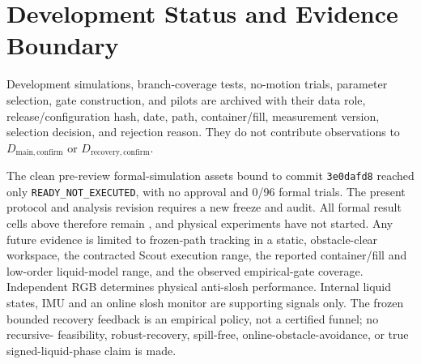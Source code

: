 \section{Development Status and Evidence Boundary}

Development simulations, branch-coverage tests, no-motion trials, parameter
selection, gate construction, and pilots are archived with their data role,
release/configuration hash, date, path, container/fill, measurement version,
selection decision, and rejection reason. They do not contribute observations
to $D_{\mathrm{main,confirm}}$ or $D_{\mathrm{recovery,confirm}}$.

The clean pre-review formal-simulation assets bound to commit
\texttt{3e0dafd8} reached only \texttt{READY\_NOT\_EXECUTED}, with no approval
and 0/96 formal trials. The present protocol and analysis revision requires a
new freeze and audit. All formal
result cells above therefore remain \Pending{}, and physical experiments have
not started. Any future evidence is
limited to frozen-path tracking in a static, obstacle-clear workspace, the
contracted Scout execution range, the reported container/fill and low-order
liquid-model range, and the observed empirical-gate coverage. Independent RGB
determines physical anti-slosh performance. Internal liquid states, IMU and an
online slosh monitor are supporting signals only. The frozen bounded recovery
feedback is an empirical policy, not a certified funnel; no recursive-
feasibility, robust-recovery, spill-free, online-obstacle-avoidance, or true
signed-liquid-phase claim is made.

